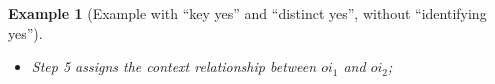 \documentclass[10pt]{article}
\newtheorem{example}{Example}[section]
\begin{document}
\begin{example} [Example with ``key yes'' and ``distinct yes'', without ``identifying yes'']
\begin{itemize}
\begin{itemize}
    \item When deal with $o_2$,
        \begin{itemize}
        \item $KeyVal=1$.
        \item Create an entity instance $\langle ei_2, Tree\rangle$; $EntIdx=\{\langle o_1, 2007\rangle\rightarrow ei_1, \langle o_2, 1\rangle\rightarrow ei_2\}$.
        \item Create an observation instance $\langle oi_2, ei_2 \rangle$.
            No need to update $ObsIdx$ because $o_2$ is not identified as {\em distinct}.
        \item Connect $mi_2$, $mi_3$ and $mi_4$ to $oi_2$;
        \end{itemize}
    \end{itemize}
    \item Step 5 assigns the context relationship between $oi_1$ and $oi_2$;
    \end{itemize}
    

\end{example}
\end{document}
